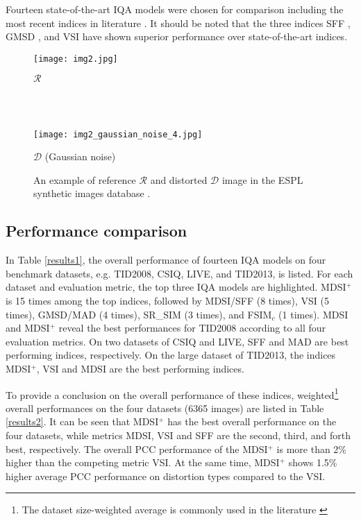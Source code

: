 Fourteen state-of-the-art IQA models were chosen for comparison \cite{SSIM, MSSSIM, VIF, GS, MAD, IWSSIM, RFSIM, SRSIM, FSIM, GMSD, SFF, VSI} including the most recent indices in literature \cite{SFF, GMSD, VSI}. It should be noted that the three indices SFF \cite{SFF}, GMSD \cite{GMSD}, and VSI \cite{VSI} have shown superior performance over state-of-the-art indices.        



\begin{figure}[htb]
\scriptsize
\begin{minipage}[b]{0.99\linewidth}
  \centering
  \centerline{\texttt{[image: img2.jpg]}} 
  \vspace{0.10cm}
\centerline{$\mathcal{R}$}
\end{minipage}
\\ \\
\begin{minipage}[b]{.99\linewidth}
  \centering
  \centerline{\texttt{[image: img2\_gaussian\_noise\_4.jpg]}}
  \vspace{0.10cm}
\centerline{$\mathcal{D}$ (Gaussian noise)}
\end{minipage}
\caption{An example of reference $\mathcal{R}$ and distorted $\mathcal{D}$ image in the ESPL synthetic images database \cite{ESPL}.}
\label{fig:synthetic}
\end{figure}


   


\subsection{Performance comparison}
\label{performance}

In Table \ref{results1}, the overall performance of fourteen IQA models on four benchmark datasets, e.g. TID2008, CSIQ, LIVE, and TID2013, is listed. For each dataset and evaluation metric, the top three IQA models are highlighted. MDSI$^+$ is 15 times among the top indices, followed by MDSI/SFF (8 times), VSI (5 times), GMSD/MAD (4 times), SR\_SIM (3 times), and FSIM$_c$ (1 times). MDSI and MDSI$^+$ reveal the best performances for TID2008 according to all four evaluation metrics. On two datasets of CSIQ and LIVE, SFF and MAD are best performing indices, respectively. On the large dataset of TID2013, the indices MDSI$^+$, VSI and MDSI are the best performing indices. 

To provide a conclusion on the overall performance of these indices, weighted\footnote{The dataset size-weighted average is commonly used in the literature \cite{IWSSIM, SFF, GMSD, VSI}} overall performances on the four datasets (6365 images) are listed in Table \ref{results2}. It can be seen that MDSI$^+$ has the best overall performance on the four datasets, while metrics MDSI, VSI and SFF are the second, third, and forth best, respectively. The overall PCC performance of the MDSI$^+$ is more than 2\% higher than the competing metric VSI. At the same time, MDSI$^+$ shows 1.5\% higher average PCC performance on distortion types compared to the VSI. 




